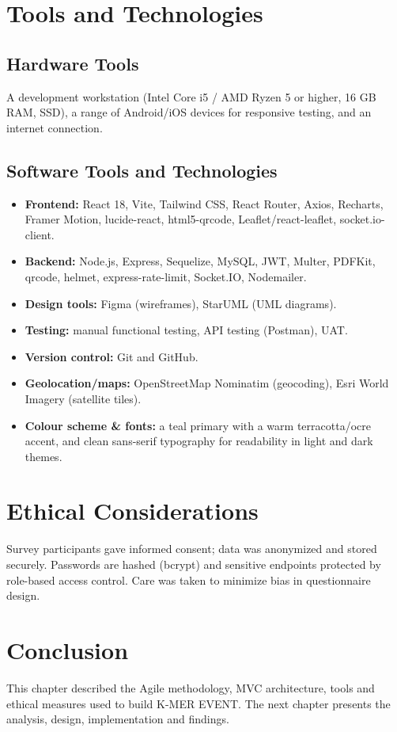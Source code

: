 \documentclass[12pt,a4paper]{report}
\begin{document}
\section{Tools and Technologies}
\subsection{Hardware Tools}
A development workstation (Intel Core i5 / AMD Ryzen 5 or higher, 16 GB RAM, SSD), a range of
Android/iOS devices for responsive testing, and an internet connection.

\subsection{Software Tools and Technologies}
\begin{itemize}
  \item \textbf{Frontend:} React 18, Vite, Tailwind CSS, React Router, Axios, Recharts,
        Framer Motion, lucide-react, html5-qrcode, Leaflet/react-leaflet, socket.io-client.
  \item \textbf{Backend:} Node.js, Express, Sequelize, MySQL, JWT, Multer, PDFKit, qrcode,
        helmet, express-rate-limit, Socket.IO, Nodemailer.
  \item \textbf{Design tools:} Figma (wireframes), StarUML (UML diagrams).
  \item \textbf{Testing:} manual functional testing, API testing (Postman), UAT.
  \item \textbf{Version control:} Git and GitHub.
  \item \textbf{Geolocation/maps:} OpenStreetMap Nominatim (geocoding), Esri World Imagery
        (satellite tiles).
  \item \textbf{Colour scheme \& fonts:} a teal primary with a warm terracotta/ocre accent,
        and clean sans-serif typography for readability in light and dark themes.
\end{itemize}

\section{Ethical Considerations}
Survey participants gave informed consent; data was anonymized and stored securely.
Passwords are hashed (bcrypt) and sensitive endpoints protected by role-based access control.
Care was taken to minimize bias in questionnaire design.

\section{Conclusion}
This chapter described the Agile methodology, MVC architecture, tools and ethical measures
used to build K-MER EVENT. The next chapter presents the analysis, design, implementation
and findings.
\end{document}
